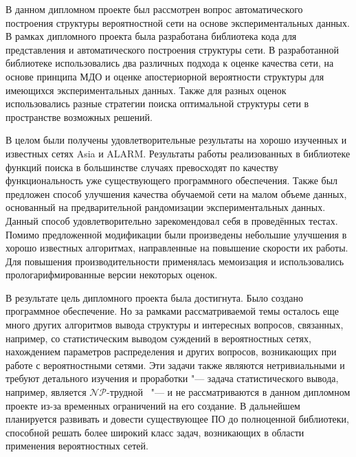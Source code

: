 
В данном дипломном проекте был рассмотрен вопрос автоматического построения структуры вероятностной сети на основе экспериментальных данных.
В рамках дипломного проекта была разработана библиотека кода для представления и автоматического построения структуры сети.
В разработанной библиотеке использовались два различных подхода к оценке качества сети, на основе принципа МДО и оценке апостериорной вероятности структуры для имеющихся экспериментальных данных.
Также для разных оценок использовались разные стратегии поиска оптимальной структуры сети в пространстве возможных решений.

В целом были получены удовлетворительные результаты на хорошо изученных и известных сетях Asia и ALARM.
Результаты работы реализованных в библиотеке функций поиска в большинстве случаях превосходят по качеству функциональность уже существующего программного обеспечения.
Также был предложен способ улучшения качества обучаемой сети на малом объеме данных, основанный на предварительной рандомизации экспериментальных данных.
Данный способ удовлетворительно зарекомендовал себя в проведённых тестах.
Помимо предложенной модификации были произведены небольшие улучшения в хорошо известных алгоритмах, направленные на повышение скорости их работы.
Для повышения производительности применялась мемоизация и использовались прологарифмированные версии некоторых оценок.

В результате цель дипломного проекта была достигнута.
Было создано программное обеспечение.
Но за рамками рассматриваемой темы осталось еще много других алгоритмов вывода структуры и интересных вопросов, связанных, например, со статистическим выводом суждений в вероятностных сетях, нахождением параметров распределения и других вопросов, возникающих при работе с вероятностными сетями.
Эти задачи также являются нетривиальными и требуют детального изучения и проработки "--- задача статистического вывода, например, является $\mathcal{NP}$-трудной~\cite{Koller_2009} "--- и не рассматриваются в данном дипломном проекте из-за временных ограничений на его создание.
В дальнейшем планируется развивать и довести существующее ПО до полноценной библиотеки, способной решать более широкий класс задач, возникающих в области применения вероятностных сетей.